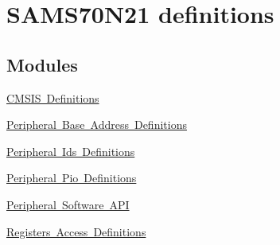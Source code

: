 \hypertarget{group__SAMS70N21__definitions}{}\section{S\+A\+M\+S70\+N21 definitions}
\label{group__SAMS70N21__definitions}
\subsection*{Modules}
\begin{DoxyCompactItemize}
\item 
\mbox{\hyperlink{group__SAMS70N21__cmsis}{C\+M\+S\+I\+S Definitions}}
\item 
\mbox{\hyperlink{group__SAMS70N21__base}{Peripheral Base Address Definitions}}
\item 
\mbox{\hyperlink{group__SAMS70N21__id}{Peripheral Ids Definitions}}
\item 
\mbox{\hyperlink{group__SAMS70N21__pio}{Peripheral Pio Definitions}}
\item 
\mbox{\hyperlink{group__SAMS70N21__api}{Peripheral Software A\+PI}}
\item 
\mbox{\hyperlink{group__SAMS70N21__reg}{Registers Access Definitions}}
\end{DoxyCompactItemize}
